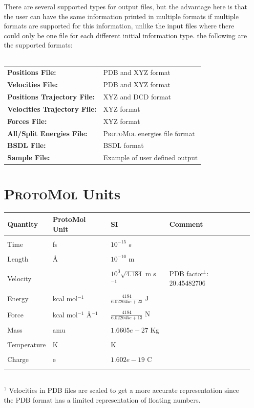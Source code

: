\documentclass[11pt]{report}
\newcommand{\ProtoMol}{\textsc{ProtoMol }}
\begin{document}
There are several supported types for output files, but the advantage
here is that the user can have the same information printed in
multiple formats if multiple formats are supported for this
information, unlike the input files where there could only be one file
for each different initial information type.  the following are the
supported formats:
\\
\\
\begin{tabular}{ll}
{\bf Positions File:}& PDB and XYZ format\\
{\bf Velocities File:}& PDB and XYZ format\\
{\bf Positions Trajectory File:}& XYZ and DCD format\\
{\bf Velocities Trajectory File:}& XYZ format\\
{\bf Forces File:}& XYZ format\\
{\bf All/Split Energies File:}& \ProtoMol energies file format\\
{\bf BSDL File:}& BSDL format\\
{\bf Sample File:}& Example of user defined output
\end{tabular}


\section{\ProtoMol Units}

  \begin{tabular}{llll}\hline
    Quantity   & ProtoMol Unit   & SI         & Comment   \\\hline\\
    Time       & fs              & $10^{-15}$ s& \\ \\
    Length     & \AA             & $10^{-10}$ m&  \\ \\
    Velocity   &   & $10^{3} \sqrt{4.184}$ m s$^{-1}$  &  PDB factor$^1$: 20.45482706\\ \\
    Energy     & kcal mol$^{-1}$ &$ \frac{4184}{6.022045e+23}$ J & \\ \\
    Force      & kcal mol$^{-1}$ \AA $^{-1}$  &  $\frac{4184}{6.022045e+13}$ N & \\ \\
    Mass       & amu    & $1.6605e-27$ Kg                & \\ \\
    Temperature & K        & K               & \\ \\
    Charge     & e        & $1.602e-19$ C                &\\ \\\hline
  \end{tabular}
\\
$^1$ Velocities  in PDB files are scaled to get a more accurate
    representation since the PDB format has a limited representation
    of floating numbers.
\end{document}
